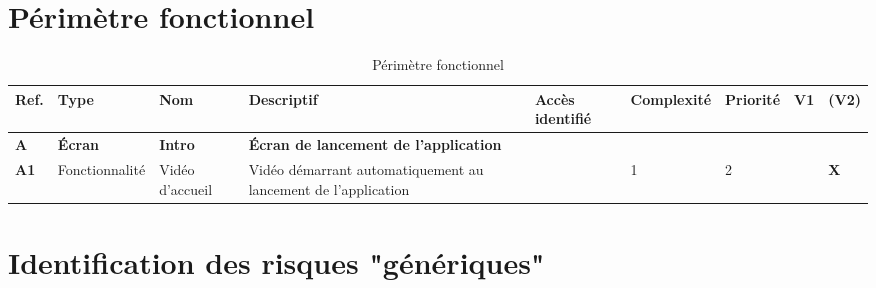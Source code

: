 \documentclass[12pt]{article}
\begin{document}
\section{Périmètre fonctionnel}
\begin{landscape}
\begin{table}[H]
\scriptsize
\caption{Périmètre fonctionnel}
\begin{tabular}{p{1cm}p{2cm}p{3cm}p{10cm}p{1.75cm}p{1.5cm}p{1.25cm}p{.5cm}p{.5cm}}
\hline  Ref.	\cellcolor{gray!25}&Type \cellcolor{gray!25}& Nom\cellcolor{gray!25}& Descriptif \cellcolor{gray!25}& \bf Accès identifié \cellcolor{gray!25} & \bf Complexité \cellcolor{gray!25} & \bf Priorité \cellcolor{gray!25} & \bf V1 \cellcolor{gray!25} & \bf (V2) \cellcolor{gray!25}\\
\hline  	\bf A\cellcolor{gray!50}& \bf Écran\cellcolor{gray!50}& \bf Intro\cellcolor{gray!50}& \bf Écran de lancement de l’application\cellcolor{gray!50}& \cellcolor{gray!50} & \cellcolor{gray!50} &  \cellcolor{gray!50} & \cellcolor{gray!50} &  \cellcolor{gray!50}\\
\hline  	\bf A1& Fonctionnalité & Vidéo d’accueil & Vidéo démarrant automatiquement au lancement de l’application &  & 1 &  2 &  & \bf X\\



\hline
\end{tabular}
\end{table}
\end{landscape}


\section{Identification des risques "génériques"}
\end{document}
